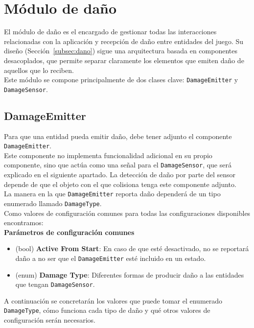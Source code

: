 \section{Módulo de daño}
El módulo de daño es el encargado de gestionar todas las interacciones relacionadas con la aplicación y recepción de daño entre entidades del juego. Su diseño (Sección~\ref{subsec:dano}) sigue una arquitectura basada en componentes desacoplados, que permite separar claramente los elementos que emiten daño de aquellos que lo reciben.\\

Este módulo se compone principalmente de dos clases clave: \texttt{DamageEmitter} y \texttt{DamageSensor}.

\subsection{DamageEmitter}
Para que una entidad pueda emitir daño, debe tener adjunto el componente \texttt{DamageEmitter}.\\
Este componente no implementa funcionalidad adicional en su propio componente, sino que actúa como una señal para el \texttt{DamageSensor}, que será explicado en el siguiente apartado. La detección de daño por parte del sensor depende de que el objeto con el que colisiona tenga este componente adjunto.\\

La manera en la que \texttt{DamageEmitter} reporta daño dependerá de un tipo enumerado llamado \texttt{DamageType}.\\
Como valores de configuración comunes para todas las configuraciones disponibles encontramos:\\

\textbf{Parámetros de configuración comunes}
\begin{itemize}
	\item (bool) \textbf{Active From Start}: En caso de que esté desactivado, no se reportará daño a no ser que el \texttt{DamageEmitter} esté incluido en un estado.
	\item (enum) \textbf{Damage Type}: Diferentes formas de producir daño a las entidades que tengan \texttt{DamageSensor}.
\end{itemize}

A continuación se concretarán los valores que puede tomar el enumerado \texttt{DamageType}, cómo funciona cada tipo de daño y qué otros valores de configuración serán necesarios.\\

